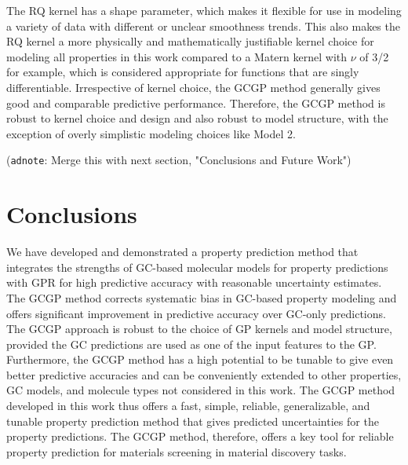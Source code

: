 \documentclass[journal=jacsat,manuscript=article, ]{achemso}
\newcommand{\adnote}[1]{{\color{OliveGreen} (\texttt{adnote}: #1)}}
\begin{document}
The RQ kernel has a shape parameter, which makes it flexible for use in modeling a variety of data with different or unclear smoothness trends. This also makes the RQ kernel a more physically and mathematically justifiable kernel choice for modeling all properties in this work compared to a Matern kernel with $\nu$ of 3/2 for example, which is considered appropriate for functions that are singly differentiable. 
Irrespective of kernel choice, the GCGP method generally gives good and comparable predictive performance.
Therefore, the GCGP method is robust to kernel choice and design and also robust to model structure, with the exception of overly simplistic modeling choices like Model 2.



\adnote{Merge this with next section, "Conclusions and Future Work"}

\section{Conclusions}
We have developed and demonstrated a property prediction method that integrates the strengths of GC-based molecular models for property predictions with GPR for high predictive accuracy with reasonable uncertainty estimates. 
The GCGP method corrects systematic bias in GC-based property modeling and offers significant improvement in predictive accuracy over GC-only predictions. The GCGP approach is robust to the choice of GP kernels and model structure, provided the GC predictions are used as one of the input features to the GP. 
Furthermore, the GCGP method has a high potential to be tunable to give even better predictive accuracies and can be conveniently extended to other properties, GC models, and molecule types not considered in this work. 
The GCGP method developed in this work thus offers a fast, simple, reliable, generalizable, and tunable property prediction method that gives predicted uncertainties for the property predictions. 
The GCGP method, therefore, offers a key tool for reliable property prediction for materials screening in material discovery tasks. 
\end{document}
